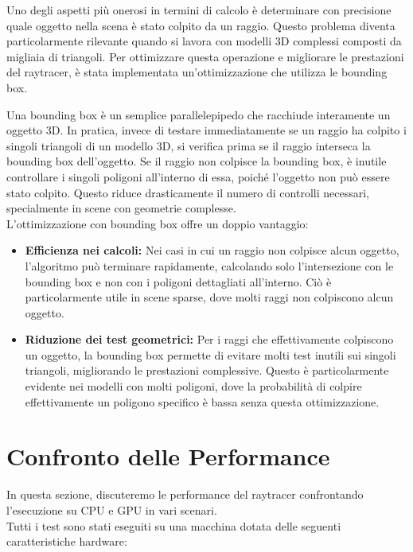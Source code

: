 \documentclass{article}
\begin{document}
Uno degli aspetti più onerosi in termini di calcolo è determinare con precisione quale oggetto nella scena è stato colpito da un raggio. Questo problema diventa particolarmente rilevante quando si lavora con modelli 3D complessi composti da migliaia di triangoli. Per ottimizzare questa operazione e migliorare le prestazioni del raytracer, è stata implementata un’ottimizzazione che utilizza le bounding box.

Una bounding box è un semplice parallelepipedo che racchiude interamente un oggetto 3D. In pratica, invece di testare immediatamente se un raggio ha colpito i singoli triangoli di un modello 3D, si verifica prima se il raggio interseca la bounding box dell'oggetto. Se il raggio non colpisce la bounding box, è inutile controllare i singoli poligoni all'interno di essa, poiché l'oggetto non può essere stato colpito. Questo riduce drasticamente il numero di controlli necessari, specialmente in scene con geometrie complesse.\\

L’ottimizzazione con bounding box offre un doppio vantaggio:
\begin{itemize}
    \item \textbf{Efficienza nei calcoli:} Nei casi in cui un raggio non colpisce alcun oggetto, l'algoritmo può terminare rapidamente, calcolando solo l'intersezione con le bounding box e non con i poligoni dettagliati all'interno. Ciò è particolarmente utile in scene sparse, dove molti raggi non colpiscono alcun oggetto.

    \item \textbf{Riduzione dei test geometrici:} Per i raggi che effettivamente colpiscono un oggetto, la bounding box permette di evitare molti test inutili sui singoli triangoli, migliorando le prestazioni complessive. Questo è particolarmente evidente nei modelli con molti poligoni, dove la probabilità di colpire effettivamente un poligono specifico è bassa senza questa ottimizzazione.
\end{itemize}

\section{Confronto delle Performance}

In questa sezione, discuteremo le performance del raytracer confrontando l'esecuzione su CPU e GPU in vari scenari.\\

Tutti i test sono stati eseguiti su una macchina dotata delle seguenti caratteristiche hardware:
\end{document}
